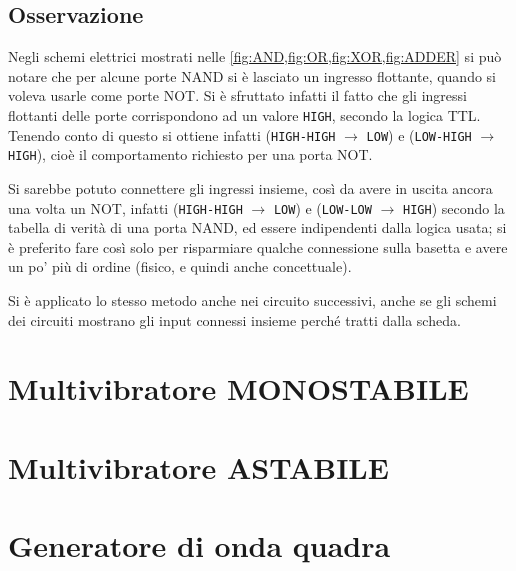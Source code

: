 \documentclass[a4paper,10pt]{article}
\def\code#1{\texttt{#1}}
\begin{document}
\subsection{Osservazione} Negli schemi elettrici mostrati nelle \cref{fig:AND,fig:OR,fig:XOR,fig:ADDER} si può notare che per alcune porte NAND si è lasciato un ingresso flottante, quando si voleva usarle come porte NOT. Si è sfruttato infatti il fatto che gli ingressi flottanti delle porte corrispondono ad un valore \code{HIGH}, secondo la logica TTL.
Tenendo conto di questo si ottiene infatti (\code{HIGH-HIGH} $\rightarrow$ \code{LOW}) e (\code{LOW-HIGH} $\rightarrow$ \code{HIGH}), cioè il comportamento richiesto per una porta NOT.

Si sarebbe potuto connettere gli ingressi insieme, così da avere in uscita ancora una volta un NOT, infatti (\code{HIGH-HIGH} $\rightarrow$ \code{LOW}) e (\code{LOW-LOW} $\rightarrow$ \code{HIGH}) secondo la tabella di verità di una porta NAND, ed essere indipendenti dalla logica usata; si è preferito fare così solo per risparmiare qualche connessione sulla basetta e avere un po' più di ordine (fisico, e quindi anche concettuale).

Si è applicato lo stesso metodo anche nei circuito successivi, anche se gli schemi dei circuiti mostrano gli input connessi insieme perché tratti dalla scheda.

\section{Multivibratore MONOSTABILE}

\section{Multivibratore ASTABILE}

\section{Generatore di onda quadra}
\end{document}
